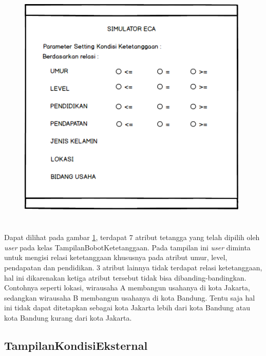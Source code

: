 \begin{figure} [H]
	\centering  
	\includegraphics[width=11cm, height=12cm]{mockup2} 
	\label{fig:kondisiTetangga} 
\end{figure}

Dapat dilihat pada gambar \ref{fig:kondisiTetangga}, terdapat 7 atribut tetangga yang telah dipilih oleh \textit{user} pada kelas TampilanBobotKetetanggaan. Pada tampilan ini \textit{user} diminta untuk mengisi relasi ketetanggaan khususnya pada atribut umur, level, pendapatan dan pendidikan. 3 atribut lainnya tidak terdapat relasi ketetanggaan, hal ini dikarenakan ketiga atribut tersebut tidak bisa dibanding-bandingkan. Contohnya seperti lokasi, wirausaha A membangun usahanya di kota Jakarta, sedangkan wirausaha B membangun usahanya di kota Bandung. Tentu saja hal ini tidak dapat ditetapkan sebagai kota Jakarta lebih dari kota Bandung atau kota Bandung kurang dari kota Jakarta.

\subsection{TampilanKondisiEksternal}

